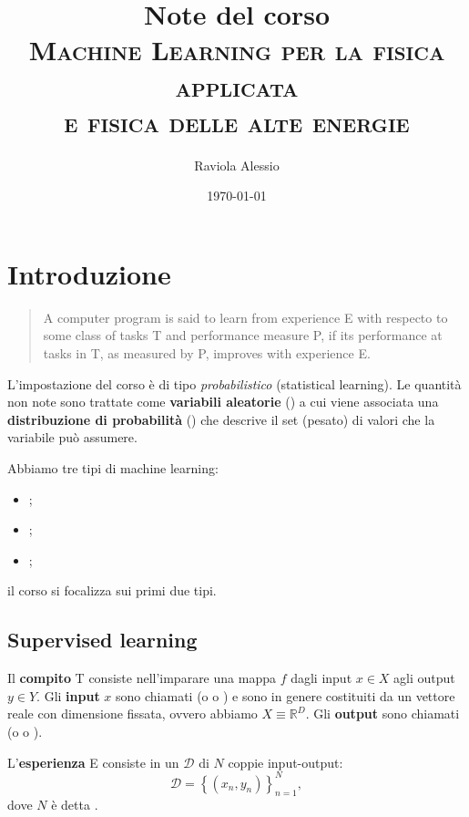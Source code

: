 \documentclass[10pt]{article}
\begin{document}
\title{Note del corso\\\textsc{Machine Learning per la fisica applicata\\e fisica delle alte energie}}
\author{Raviola Alessio}
\date{\today}

\maketitle

\section{Introduzione}
%
%
\begin{quotation}
A computer program is said to learn from experience E with respecto to some
class of tasks T and performance measure P, if its performance at tasks in T, as
measured by P, improves with experience E.
\end{quotation}
L'impostazione del corso è di tipo \textit{probabilistico} (statistical
learning). Le quantità non note sono trattate come \textbf{variabili aleatorie}
() a cui viene associata una \textbf{distribuzione di
probabilità} () che descrive il set (pesato) di
valori che la variabile può assumere.

Abbiamo tre tipi di machine learning:
\begin{itemize}
\item {};
\item {};
\item {};
\end{itemize}
il corso si focalizza sui primi due tipi.

\subsection{Supervised learning}
Il \textbf{compito} T consiste nell'imparare una mappa $f$ dagli input $x\in X$
agli output $y\in Y$. Gli \textbf{input} $x$ sono chiamati  (o
 o ) e sono in genere costituiti da un vettore
reale con dimensione fissata, ovvero abbiamo $X\equiv \mathbb{R}^D$. Gli
\textbf{output} sono chiamati  (o  o ).

L'\textbf{esperienza} E consiste in un  $\mathcal{D}$ di $N$
coppie input-output:
\begin{equation}
\mathcal{D} = \left\{ (x_n, y_n) \right\}_{n=1}^N,
\end{equation}
dove \( N \) è detta .
\end{document}
